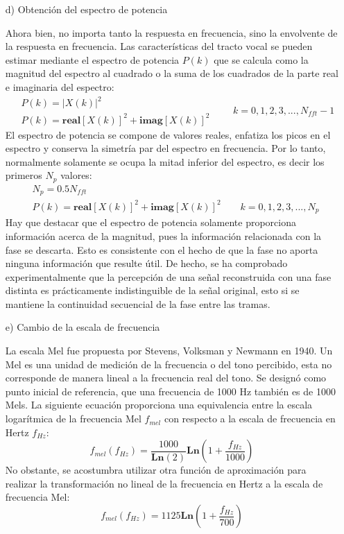 \begin{enumerate}
\item[d)]Obtención del espectro de potencia
\par
Ahora bien, no importa tanto la respuesta en frecuencia, sino la envolvente de la respuesta en frecuencia. Las características del tracto vocal se pueden estimar mediante el espectro de potencia $P(k)$ que se calcula como la magnitud del espectro al cuadrado o la suma de los cuadrados de la parte real e imaginaria del espectro:
\begin{equation}
\label{eq:ecuacion45}
\begin{aligned}
& P(k) = \left | X(k) \right |^{2} \\
& P(k) = \mathbf{real}[X(k)]^{2} + \mathbf{imag}[X(k)]^{2}
\end{aligned}
\qquad
k = 0,1,2,3,...,N_{fft}-1
\end{equation}
El espectro de potencia se compone de valores reales, enfatiza los picos en el espectro y conserva la simetría par del espectro en frecuencia. Por lo tanto, normalmente solamente se ocupa la mitad inferior del espectro, es decir los primeros $N_{p}$ valores:
\begin{equation}
\label{eq:ecuacion46}
\begin{aligned}
& N_{p} = 0.5N_{fft} \\
& P(k) = \mathbf{real}[X(k)]^{2} + \mathbf{imag}[X(k)]^{2} \qquad k = 0,1,2,3,...,N_{p}
\end{aligned}
\end{equation}
Hay que destacar que el espectro de potencia solamente proporciona información acerca de la magnitud, pues la información relacionada con la fase se descarta. Esto es consistente con el hecho de que la fase no aporta ninguna información que resulte útil. De hecho, se ha comprobado experimentalmente que la percepción de una señal reconstruida con una fase distinta es prácticamente indistinguible de la señal original, esto si se mantiene la continuidad secuencial de la fase entre las tramas.
\newpage
\item[e)]Cambio de la escala de frecuencia
\par
La escala Mel fue propuesta por Stevens, Volksman y Newmann en 1940. Un Mel es una unidad de medición de la frecuencia o del tono percibido, esta no corresponde de manera lineal a la frecuencia real del tono. Se designó como punto inicial de referencia, que una frecuencia de 1000 Hz también es de 1000 Mels.
\vskip 0.5cm
La siguiente ecuación proporciona una equivalencia entre la escala logarítmica de la frecuencia Mel $f_{mel}$ con respecto a la escala de frecuencia en Hertz $f_{Hz}$:
\begin{equation}
\label{eq:ecuacion47}
f_{mel}(f_{Hz}) = \frac{1000}{\mathbf{Ln}(2)}\mathbf{Ln}\left ( 1 + \frac{f_{Hz}}{1000} \right )
\end{equation}
No obstante, se acostumbra utilizar otra función de aproximación para realizar la transformación no lineal de la frecuencia en Hertz a la escala de frecuencia Mel:
\begin{equation}
\label{eq:ecuacion48}
f_{mel}(f_{Hz}) = 1125\mathbf{Ln}\left ( 1 + \frac{f_{Hz}}{700} \right )
\end{equation}


\end{enumerate}
